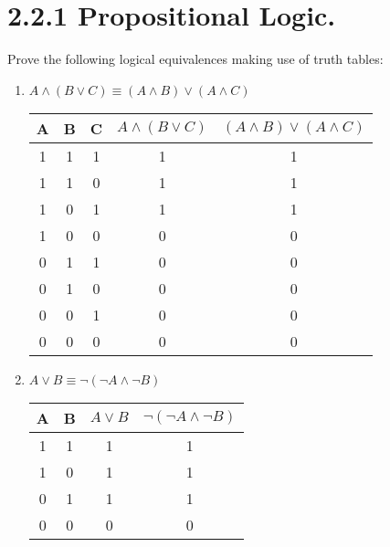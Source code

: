 \documentclass{article}
\begin{document}
\section*{2.2.1 Propositional Logic.}
Prove the following logical equivalences making use of truth tables:
\renewcommand{\labelenumi}{\alph{enumi})}
\begin{enumerate}
    \item $A \wedge (B \vee C) \equiv (A \wedge B) \vee (A \wedge C)$
    \begin{table}[h!]
        \centering
        \begin{tabular}{|c|c|c|c||c|}
            \hline
            \textbf{A} & \textbf{B} & \textbf{C} & \textbf{$A \wedge (B \vee C)$} & \textbf{$(A \wedge B) \vee (A \wedge C)$}\\
            \hline
            1 & 1 & 1 & 1 & 1\\
            \hline
            1 & 1 & 0 & 1 & 1\\
            \hline
            1 & 0 & 1 & 1 & 1\\
            \hline
            1 & 0 & 0 & 0 & 0\\
            \hline
            0 & 1 & 1 & 0 & 0\\
            \hline
            0 & 1 & 0 & 0 & 0\\
            \hline
            0 & 0 & 1 & 0 & 0\\
            \hline
            0 & 0 & 0 & 0 & 0\\
            \hline
        \end{tabular}
    \end{table}

    \item $A \vee B \equiv \neg(\neg A \wedge \neg B)$
    \begin{table}[h!]
        \centering
        \begin{tabular}{|c|c|c||c|}
            \hline
            \textbf{A} & \textbf{B} & \textbf{$A \vee B$} & \textbf{$\neg(\neg A \wedge \neg B)$}\\
            \hline
            1 & 1 & 1 & 1 \\
            \hline
            1 & 0 & 1 & 1 \\
            \hline
            0 & 1 & 1 & 1 \\
            \hline
            0 & 0 & 0 & 0 \\
            \hline
        \end{tabular}
    \end{table}


\end{enumerate}
\end{document}
